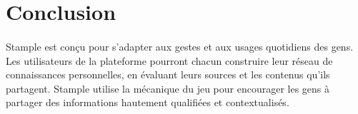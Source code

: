 \section{Conclusion}

\paragraph{}
Stample est conçu pour s'adapter aux gestes et aux usages quotidiens des gens. Les utilisateurs de la plateforme pourront chacun construire leur réseau de connaissances personnelles, en évaluant leurs sources et les contenus qu'ils partagent.
Stample utilise la mécanique du jeu pour encourager les gens à partager des informations hautement qualifiées et contextualisés.
